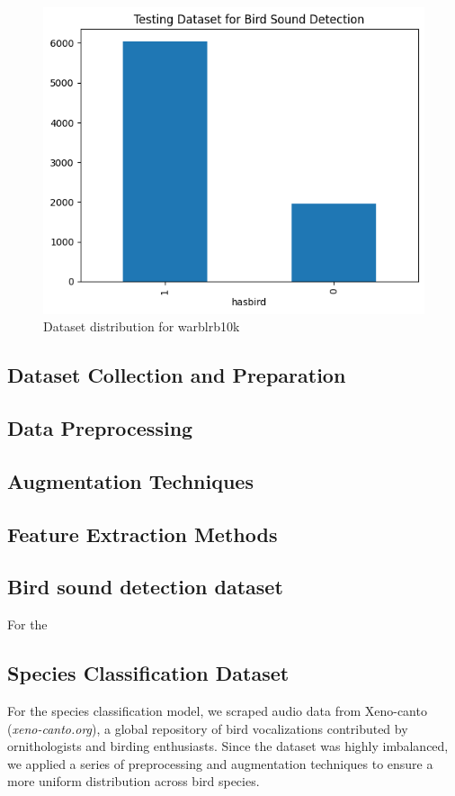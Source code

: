 \begin{figure}[h!]
    \centering
    \includegraphics[scale=0.45]{images/det_testingdataset.png}
    \caption{Dataset distribution for warblrb10k}
    \label{fig:warblrb10k dataset}
\end{figure}

\subsection{Dataset Collection and Preparation}
\subsection{Data Preprocessing}
\subsection{Augmentation Techniques}
\subsection{Feature Extraction Methods}

\subsection{Bird sound detection dataset}
For the

\subsection{Species Classification Dataset}
For the species classification model, we scraped audio data from Xeno-canto
(\textit{xeno-canto.org}), a global repository of bird vocalizations
contributed by ornithologists and birding enthusiasts. Since the dataset was
highly imbalanced, we applied a series of preprocessing and augmentation
techniques to ensure a more uniform distribution across bird species.

